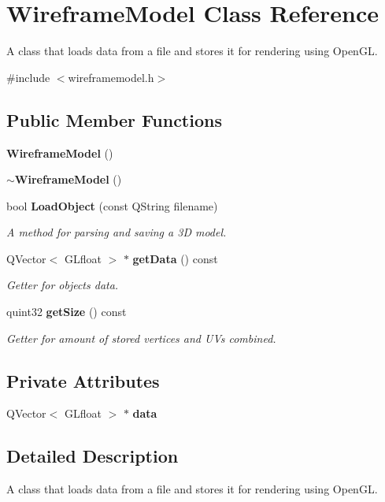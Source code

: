 \section{Wireframe\+Model Class Reference}
\label{class_wireframe_model}


A class that loads data from a file and stores it for rendering using Open\+GL.  




{\ttfamily \#include $<$wireframemodel.\+h$>$}

\subsection*{Public Member Functions}
\begin{DoxyCompactItemize}
\item 
\textbf{ Wireframe\+Model} ()
\item 
\textbf{ $\sim$\+Wireframe\+Model} ()
\item 
bool \textbf{ Load\+Object} (const Q\+String filename)
\begin{DoxyCompactList}\small\item\em A method for parsing and saving a 3D model. \end{DoxyCompactList}\item 
Q\+Vector$<$ G\+Lfloat $>$ $\ast$ \textbf{ get\+Data} () const
\begin{DoxyCompactList}\small\item\em Getter for object\textquotesingle{}s data. \end{DoxyCompactList}\item 
quint32 \textbf{ get\+Size} () const
\begin{DoxyCompactList}\small\item\em Getter for amount of stored vertices and UV\textquotesingle{}s combined. \end{DoxyCompactList}\end{DoxyCompactItemize}
\subsection*{Private Attributes}
\begin{DoxyCompactItemize}
\item 
Q\+Vector$<$ G\+Lfloat $>$ $\ast$ \textbf{ data}
\end{DoxyCompactItemize}


\subsection{Detailed Description}
A class that loads data from a file and stores it for rendering using Open\+GL. 

